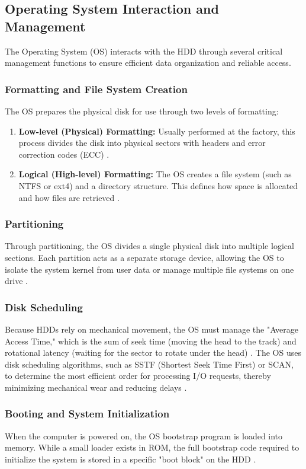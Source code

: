 \subsection{Operating System Interaction and Management}
The Operating System (OS) interacts with the HDD through several critical management functions to ensure efficient data organization and reliable access.

\subsubsection{Formatting and File System Creation}
The OS prepares the physical disk for use through two levels of formatting:
\begin{enumerate}
    \item \textbf{Low-level (Physical) Formatting:} Usually performed at the factory, this process divides the disk into physical sectors with headers and error correction codes (ECC) \cite{gfg_disk_mgmt, wiki_hdd}.
    \item \textbf{Logical (High-level) Formatting:} The OS creates a file system (such as NTFS or ext4) and a directory structure. This defines how space is allocated and how files are retrieved \cite{gfg_disk_mgmt, wiki_hdd}.
\end{enumerate}

\subsubsection{Partitioning}
Through partitioning, the OS divides a single physical disk into multiple logical sections. Each partition acts as a separate storage device, allowing the OS to isolate the system kernel from user data or manage multiple file systems on one drive \cite{gfg_disk_mgmt}.

\subsubsection{Disk Scheduling}
Because HDDs rely on mechanical movement, the OS must manage the "Average Access Time," which is the sum of seek time (moving the head to the track) and rotational latency (waiting for the sector to rotate under the head) \cite{gfg_hdd_memory, wiki_hdd}. The OS uses disk scheduling algorithms, such as SSTF (Shortest Seek Time First) or SCAN, to determine the most efficient order for processing I/O requests, thereby minimizing mechanical wear and reducing delays \cite{gfg_disk_mgmt}.

\subsubsection{Booting and System Initialization}
When the computer is powered on, the OS bootstrap program is loaded into memory. While a small loader exists in ROM, the full bootstrap code required to initialize the system is stored in a specific "boot block" on the HDD \cite{gfg_disk_mgmt}.

